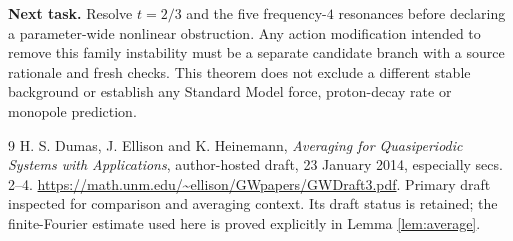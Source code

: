 \documentclass[11pt,a4paper]{article}
\begin{document}
\textbf{Next task.} Resolve $t=2/3$ and the five frequency-$4$ resonances before declaring a parameter-wide nonlinear obstruction. Any action modification intended to remove this family instability must be a separate candidate branch with a source rationale and fresh checks. This theorem does not exclude a different stable background or establish any Standard Model force, proton-decay rate or monopole prediction.

\begin{thebibliography}{9}
 H. S. Dumas, J. Ellison and K. Heinemann, \emph{Averaging for Quasiperiodic Systems with Applications}, author-hosted draft, 23 January 2014, especially secs. 2--4. \url{https://math.unm.edu/~ellison/GWpapers/GWDraft3.pdf}. Primary draft inspected for comparison and averaging context. Its draft status is retained; the finite-Fourier estimate used here is proved explicitly in Lemma \ref{lem:average}.
\end{thebibliography}
\end{document}
